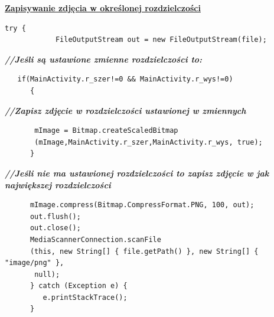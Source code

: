 \begin{center}
\underline{\textbf{Zapisywanie zdjęcia w określonej rozdzielczości}}
\end{center}

\begin{verbatim}
try {
			FileOutputStream out = new FileOutputStream(file);\end{verbatim}
			                                     \textit{\textbf{//Jeśli są ustawione zmienne rozdzielczości to:}}
			                                       \begin{verbatim}
   if(MainActivity.r_szer!=0 && MainActivity.r_wys!=0)
      {\end{verbatim}
                                           \textit{\textbf{//Zapisz zdjęcie w rozdzielczości ustawionej w zmiennych}}
                                             \begin{verbatim}
       mImage = Bitmap.createScaledBitmap
       (mImage,MainActivity.r_szer,MainActivity.r_wys, true);
      }\end{verbatim}
                                           \textit{\textbf{//Jeśli nie ma ustawionej rozdzielczości to zapisz zdjęcie w jak największej rozdzielczości}}
                                             \begin{verbatim}
      mImage.compress(Bitmap.CompressFormat.PNG, 100, out);
      out.flush();
      out.close();
      MediaScannerConnection.scanFile
      (this, new String[] { file.getPath() }, new String[] { "image/png" },
       null);
      } catch (Exception e) {
         e.printStackTrace();
      }
\end{verbatim}
